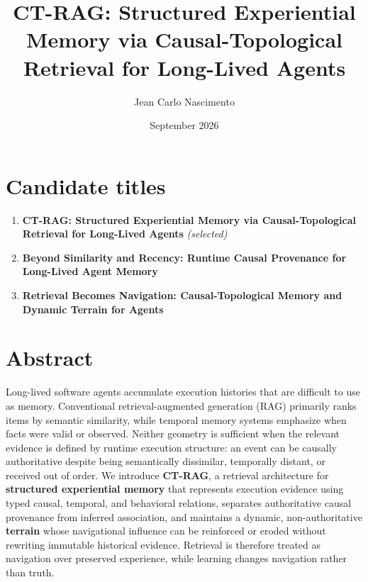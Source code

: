 \documentclass[
  11pt,
]{article}
\title{CT-RAG: Structured Experiential Memory via Causal-Topological
Retrieval for Long-Lived Agents}
\author{Jean Carlo Nascimento}
\date{September 2026}
\providecommand{\tightlist}{%
  \setlength{\itemsep}{0pt}\setlength{\parskip}{0pt}}
\begin{document}
\maketitle

\section{Candidate titles}\label{candidate-titles}

\begin{enumerate}
\def\labelenumi{\arabic{enumi}.}
\tightlist
\item
  \textbf{CT-RAG: Structured Experiential Memory via Causal-Topological
  Retrieval for Long-Lived Agents} \emph{(selected)}
\item
  \textbf{Beyond Similarity and Recency: Runtime Causal Provenance for
  Long-Lived Agent Memory}
\item
  \textbf{Retrieval Becomes Navigation: Causal-Topological Memory and
  Dynamic Terrain for Agents}
\end{enumerate}

\section{Abstract}\label{abstract}

Long-lived software agents accumulate execution histories that are
difficult to use as memory. Conventional retrieval-augmented generation
(RAG) primarily ranks items by semantic similarity, while temporal
memory systems emphasize when facts were valid or observed. Neither
geometry is sufficient when the relevant evidence is defined by runtime
execution structure: an event can be causally authoritative despite
being semantically dissimilar, temporally distant, or received out of
order. We introduce \textbf{CT-RAG}, a retrieval architecture for
\textbf{structured experiential memory} that represents execution
evidence using typed causal, temporal, and behavioral relations,
separates authoritative causal provenance from inferred association, and
maintains a dynamic, non-authoritative \textbf{terrain} whose
navigational influence can be reinforced or eroded without rewriting
immutable historical evidence. Retrieval is therefore treated as
navigation over preserved experience, while learning changes navigation
rather than truth.
\end{document}
